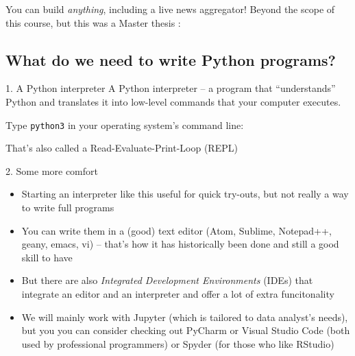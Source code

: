 \begin{frame}{You can build \emph{anything}, including a live news aggregator!} 
	Beyond the scope of this course, but this was a Master thesis \parencite{3bij3}:
\end{frame}


\begin{frame}[plain]
\end{frame}

\subsection{What do we need to write Python programs?}

\begin{frame}{1. A Python interpreter}
A Python interpreter -- a program that ``understands'' Python and translates it into low-level commands that your computer executes.

Type \texttt{python3} in your operating system's command line:

That's also called a Read-Evaluate-Print-Loop (REPL)
\end{frame}

\begin{frame}{2. Some more comfort}
\begin{itemize}[<+->]
	\item Starting an interpreter like this useful for quick try-outs, but not really a way to write full programs
	\item You can write them in a (good) text editor (Atom, Sublime, Notepad++, geany, emacs, vi) -- that's how it has historically been done and still a good skill to have
	\item But there are also \emph{Integrated Development Environments} (IDEs) that integrate an editor and an interpreter and offer a lot of extra funcitonality
	\item We will mainly work with Jupyter (which is tailored to data analyst's needs), but you you can consider checking out PyCharm or Visual Studio Code (both used by professional programmers) or Spyder (for those who like RStudio)
\end{itemize}
\end{frame}

